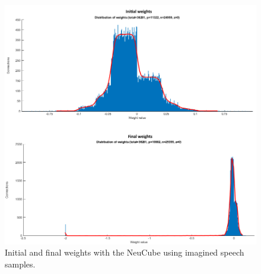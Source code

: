 \begin{figure}[h!]
\centering
\includegraphics[scale=0.44]{Figures/NeuCube_Weights_Imagined.png}
\caption{Initial and final weights with the NeuCube using imagined speech samples.}
\label{Fig: NeuCube_Weights_Imagined}
\end{figure}

